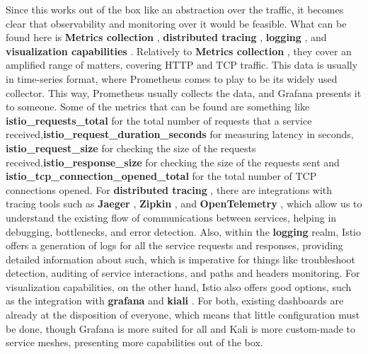Since this works out of the box like an abstraction over the traffic, it becomes clear that observability and monitoring over it would be feasible. What can be found here is \textbf{Metrics collection} , \textbf{distributed tracing} , \textbf{logging} , and \textbf{visualization capabilities} . Relatively to \textbf{Metrics collection} , they cover an amplified range of matters, covering HTTP and TCP traffic. This data is usually in time-series format, where Prometheus comes to play to be its widely used collector. This way, Prometheus usually collects the data, and Grafana presents it to someone. Some of the metrics that can be found are something like \textbf{istio\_requests\_total} for the total number of requests that a service received,\textbf{istio\_request\_duration\_seconds} for measuring latency in seconds, \textbf{istio\_request\_size} for checking the size of the requests received,\textbf{istio\_response\_size} for checking the size of the requests sent and \textbf{istio\_tcp\_connection\_opened\_total} for the total number of TCP connections opened. For \textbf{distributed tracing} , there are integrations with tracing tools such as \textbf{Jaeger} , \textbf{Zipkin} , and \textbf{OpenTelemetry} , which allow us to understand the existing flow of communications between services, helping in debugging, bottlenecks, and error detection. Also, within the \textbf{logging} realm, Istio offers a generation of logs for all the service requests and responses, providing detailed information about such, which is imperative for things like troubleshoot detection, auditing of service interactions, and paths and headers monitoring. For visualization capabilities, on the other hand, Istio also offers good options, such as the integration with \textbf{grafana} and \textbf{kiali} . For both, existing dashboards are already at the disposition of everyone, which means that little configuration must be done, though Grafana is more suited for all and Kali is more custom-made to service meshes, presenting more capabilities out of the box.



